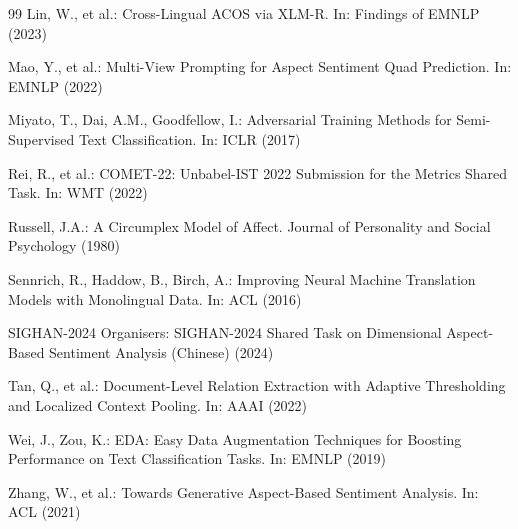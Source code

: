 \documentclass[runningheads]{llncs}
\begin{document}
\begin{thebibliography}{99}
Lin, W., et al.: Cross-Lingual ACOS via XLM-R. In: Findings of EMNLP
(2023)

Mao, Y., et al.: Multi-View Prompting for Aspect Sentiment Quad
Prediction. In: EMNLP (2022)

Miyato, T., Dai, A.M., Goodfellow, I.: Adversarial Training Methods
for Semi-Supervised Text Classification. In: ICLR (2017)

Rei, R., et al.: COMET-22: Unbabel-IST 2022 Submission for the
Metrics Shared Task. In: WMT (2022)

Russell, J.A.: A Circumplex Model of Affect. Journal of Personality
and Social Psychology (1980)

Sennrich, R., Haddow, B., Birch, A.: Improving Neural Machine
Translation Models with Monolingual Data. In: ACL (2016)

SIGHAN-2024 Organisers: SIGHAN-2024 Shared Task on Dimensional
Aspect-Based Sentiment Analysis (Chinese) (2024)

Tan, Q., et al.: Document-Level Relation Extraction with Adaptive
Thresholding and Localized Context Pooling. In: AAAI (2022)

Wei, J., Zou, K.: EDA: Easy Data Augmentation Techniques for
Boosting Performance on Text Classification Tasks. In: EMNLP (2019)

Zhang, W., et al.: Towards Generative Aspect-Based Sentiment
Analysis. In: ACL (2021)

\end{thebibliography}
\end{document}
